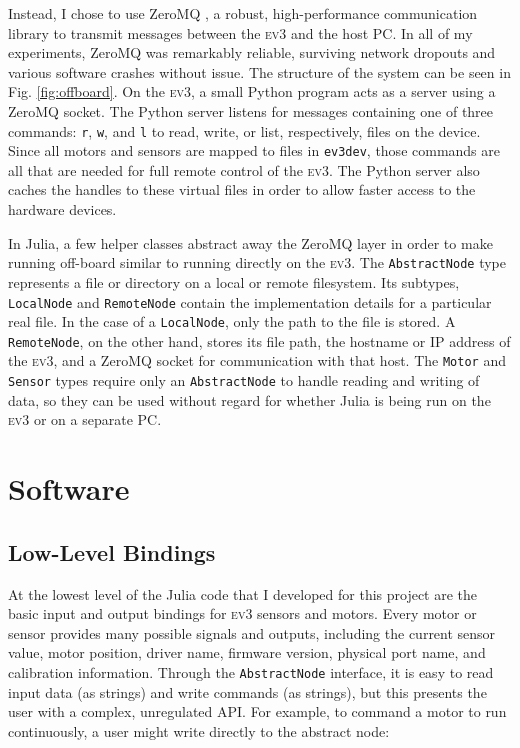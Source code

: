 \documentclass[]{article}
\newcommand{\ev}{\textsc{ev3}}
\begin{document}
Instead, I chose to use ZeroMQ \cite{hintjens_zeromq:_2015}, a robust, high-performance communication library to transmit messages between the \ev{} and the host PC. In all of my experiments, ZeroMQ was remarkably reliable, surviving network dropouts and various software crashes without issue. The structure of the system can be seen in Fig. \ref{fig:offboard}. On the \ev{}, a small Python program acts as a server using a ZeroMQ socket. The Python server listens for messages containing one of three commands: \texttt{r}, \texttt{w}, and \texttt{l} to read, write, or list, respectively, files on the device. Since all motors and sensors are mapped to files in \texttt{ev3dev}, those commands are all that are needed for full remote control of the \ev{}. The Python server also caches the handles to these virtual files in order to allow faster access to the hardware devices. 

In Julia, a few helper classes abstract away the ZeroMQ layer in order to make running off-board similar to running directly on the \ev{}. The \texttt{AbstractNode} type represents a file or directory on a local or remote filesystem. Its subtypes, \texttt{LocalNode} and \texttt{RemoteNode} contain the implementation details for a particular real file. In the case of a \texttt{LocalNode}, only the path to the file is stored. A \texttt{RemoteNode}, on the other hand, stores its file path, the hostname or IP address of the \ev{}, and a ZeroMQ socket for communication with that host. The \texttt{Motor} and \texttt{Sensor} types require only an \texttt{AbstractNode} to handle reading and writing of data, so they can be used without regard for whether Julia is being run on the \ev{} or on a separate PC. 

\section{Software}

\subsection{Low-Level Bindings}

At the lowest level of the Julia code that I developed for this project are the basic input and output bindings for \ev{} sensors and motors. Every motor or sensor provides many possible signals and outputs, including the current sensor value, motor position, driver name, firmware version, physical port name, and calibration information. Through the \texttt{AbstractNode} interface, it is easy to read input data (as strings) and write commands (as strings), but this presents the user with a complex, unregulated API. For example, to command a motor to run continuously, a user might write directly to the abstract node:
\end{document}
